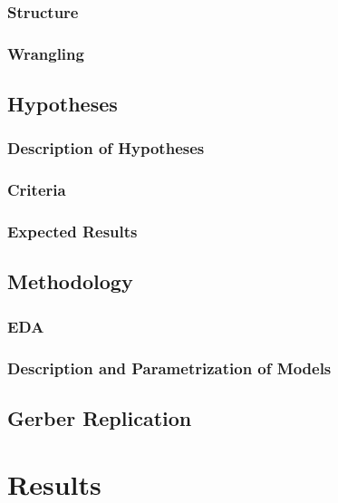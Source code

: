 \documentclass[12pt,twoside]{reedthesis}
\begin{document}
  \subsection{Structure}\label{structure}
  
  \subsection{Wrangling}\label{wrangling}
  
  \section{Hypotheses}\label{hypotheses}
  
  \subsection{Description of Hypotheses}\label{description-of-hypotheses}
  
  \subsection{Criteria}\label{criteria}
  
  \subsection{Expected Results}\label{expected-results}
  
  \section{Methodology}\label{methodology}
  
  \subsection{EDA}\label{eda}
  
  \subsection{Description and Parametrization of
  Models}\label{description-and-parametrization-of-models}
  
  \section{Gerber Replication}\label{gerber-replication}
  
  \chapter{Results}\label{results}
  
\end{document}

